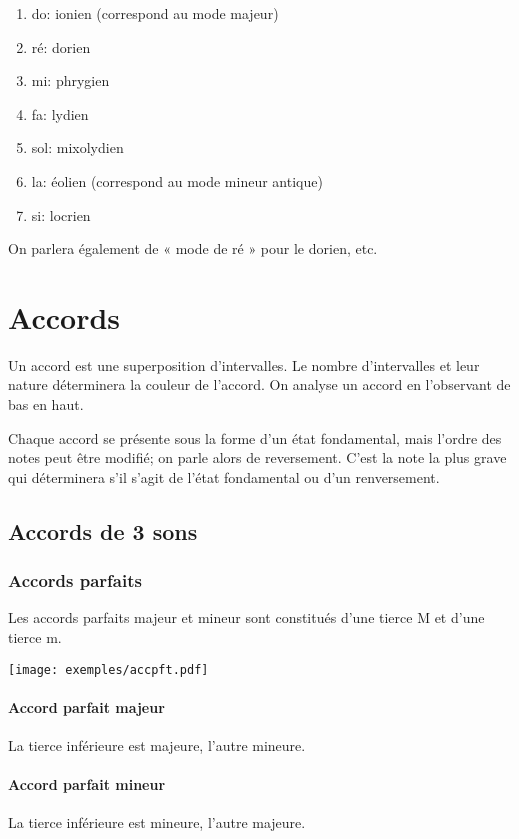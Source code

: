 \documentclass[11pt]{scrreprt}
\begin{document}
\begin{enumerate}
\item do: ionien (correspond au mode majeur)
\item ré: dorien
\item mi: phrygien
\item fa: lydien
\item sol: mixolydien
\item la: éolien (correspond au mode mineur antique)
\item si: locrien
\end{enumerate}


On parlera également de « mode de ré » pour le dorien, etc.


\chapter{Accords}
Un accord est une superposition d'intervalles. Le nombre d'intervalles et leur nature déterminera la couleur de l'accord. On analyse un accord en l'observant de bas en haut.

Chaque accord se présente sous la forme d'un état fondamental, mais l'ordre des notes peut être modifié; on parle alors de reversement. C'est la note la plus grave qui déterminera s'il s'agit de l'état fondamental ou d'un renversement.
\section{Accords de 3 sons}
\subsection{Accords parfaits}
Les accords parfaits majeur et mineur sont constitués d'une tierce M et d'une tierce m.
\begin{center}
   \texttt{[image: exemples/accpft.pdf]}
\end{center}


\subsubsection{Accord parfait majeur}\label{pftmaj}
La tierce inférieure est majeure, l'autre mineure.

\subsubsection{Accord parfait mineur}
La tierce inférieure est mineure, l'autre majeure.
\end{document}
